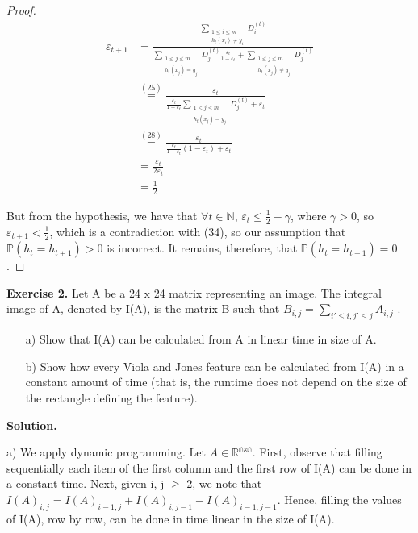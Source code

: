 \documentclass{article}
\newcommand{\<}{\langle}
\renewcommand{\>}{\rangle}
\theoremstyle{definition}
\begin{document}
\begin{proof}
\begin{align}
\varepsilon_{t+1} &= 
\frac{ \sum\limits_{\substack{1\leq i \leq m\\ h_{t}(x_i)\neq y_i}} 
 D_i^{(t)} }
{\sum\limits_{\substack{1\leq j \leq m\\ h_{t}(x_j) = y_j}}
D_j^{(t)}\frac{\varepsilon_t}{1-\varepsilon_t} +
\sum\limits_{\substack{1\leq j \leq m\\ h_{t}(x_j)\neq y_j}}
D_j^{(t)}
}
\\&\stackrel{(25)}{=}
\frac{ \varepsilon_t}
{\frac{\varepsilon_t}{1-\varepsilon_t}\sum\limits_{\substack{1\leq j \leq m\\ h_{t}(x_j) = y_j}}
D_j^{(t)} +
\varepsilon_t
}
\\&\stackrel{(28)}{=}
\frac{ \varepsilon_t}
{\frac{\varepsilon_t}{1-\varepsilon_t}(1-\varepsilon_t) +
\varepsilon_t
}
\\&=\frac{\varepsilon_t}{2\varepsilon_t}
\\&=\frac{1}{2}
\end{align}

But from the hypothesis, we have that $\forall t \in \mathbb{N}$, $\varepsilon_t \leq \frac{1}{2} - \gamma$, where $\gamma > 0$, so $\varepsilon_{t+1} < \frac{1}{2}$, which is a contradiction with (34), so our assumption that $\mathbb{P}(h_t = h_{t+1})>0$ is incorrect. It remains, therefore, that $\mathbb{P}(h_t=h_{t+1})=0$.

\end{proof}

\textbf{Exercise 2.} Let A be a 24 x 24 matrix representing an image. The integral image of A, denoted by I(A), is the matrix B such that $B_{i,j} = \sum_{i' \leq i, j' \leq j} A_{i,j}$ .

\begin{itemize}
    \item[a)] Show that I(A) can be calculated from A in linear time in size of A.
    \item[b)] Show how every Viola and Jones feature can be calculated from I(A) in a constant amount of time (that is, the runtime does not depend on the size of the rectangle defining the feature).
\end{itemize}

\textbf{Solution.}

a) We apply dynamic programming. Let $A \in \mathbb{R^{n x n}}$. First, observe that filling sequentially each item of the first column and the first row of I(A) can be done in a constant time. Next, given i, j $\geq$ 2, we note that $I(A)_{i,j} = I(A)_{i-1,j} + I(A)_{i,j-1} - I(A)_{i-1,j-1}$. Hence, filling the values of I(A), row by row, can be done in time linear in the size of I(A).
\end{document}

